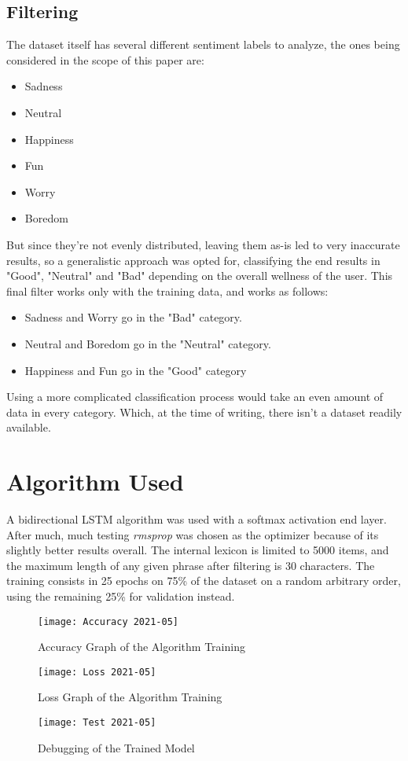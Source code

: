 \subsection{Filtering}
The dataset itself has several different sentiment labels to analyze, the ones being considered in the scope of this paper are:
\begin{itemize}
	\item Sadness
	\item Neutral
	\item Happiness
	\item Fun
	\item Worry
	\item Boredom
\end{itemize}
But since they're not evenly distributed, leaving them as-is led to very inaccurate results, so a generalistic approach was opted for, classifying the end results in "Good", "Neutral" and "Bad" depending on the overall wellness of the user.
This final filter works only with the training data, and works as follows:
\begin{itemize}
	\item Sadness and Worry go in the "Bad" category.
	\item Neutral and Boredom go in the "Neutral" category.
	\item Happiness and Fun go in the "Good" category
\end{itemize}
Using a more complicated classification process would take an even amount of data in every category. Which, at the time of writing, there isn't a dataset readily available.

\section{Algorithm Used}
A bidirectional LSTM algorithm was used with a softmax activation end layer. After much, much testing \textit{rmsprop} was chosen as the optimizer because of its slightly better results overall.
The internal lexicon is limited to 5000 items, and the maximum length of any given phrase after filtering is 30 characters.
The training consists in 25 epochs on 75\% of the dataset on a random arbitrary order, using the remaining 25\% for validation instead.
\begin{figure}[!h]
	\centering
	\texttt{[image: Accuracy 2021-05]}
	\caption{Accuracy Graph of the Algorithm Training}
	\label{fig:accuracy}
	\texttt{[image: Loss 2021-05]}
	\caption{Loss Graph of the Algorithm Training}
	\label{fig:loss}
\end{figure}
\begin{figure}[!h]
	\centering
	\texttt{[image: Test 2021-05]}
	\caption{Debugging of the Trained Model}
	\label{fig:test}
\end{figure}
\pagebreak


